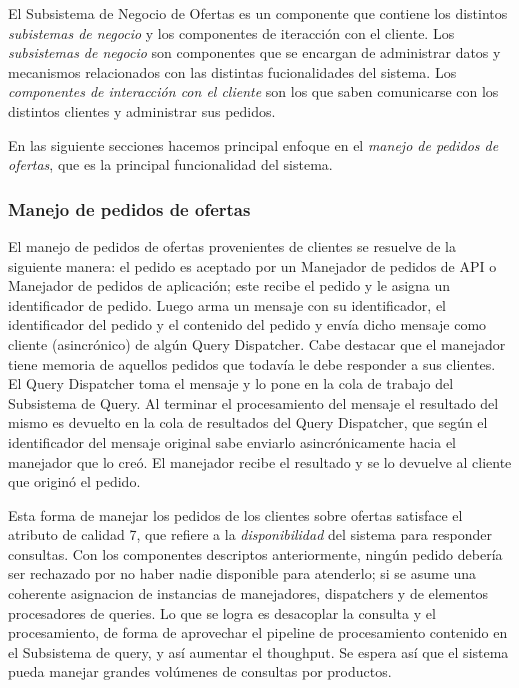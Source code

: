 El \textsf{Subsistema de Negocio de Ofertas} es un componente que contiene los distintos \emph{subistemas de negocio} y los componentes de iteracción con el cliente. Los \emph{subsistemas de negocio} son componentes que se encargan de administrar datos y mecanismos relacionados con las distintas fucionalidades del sistema. Los \emph{componentes de interacción con el cliente} son los que saben comunicarse con los distintos clientes y administrar sus pedidos.

En las siguiente secciones hacemos principal enfoque en el \emph{manejo de pedidos de ofertas}, que es la principal funcionalidad del sistema.

\subsubsection{Manejo de pedidos de ofertas}

El manejo de pedidos de ofertas provenientes de clientes se resuelve de la siguiente manera: el pedido es aceptado por un \textsf{Manejador de pedidos de API} o \textsf{Manejador de pedidos de aplicación}; este recibe el pedido y le asigna un identificador de pedido. Luego arma un mensaje con su identificador, el identificador del pedido y el contenido del pedido y env\'ia dicho mensaje como cliente (asincrónico) de alg\'un \textsf{Query Dispatcher}. Cabe destacar que el manejador tiene memoria de aquellos pedidos que todavía le debe responder a sus clientes. El \textsf{Query Dispatcher} toma el mensaje y lo pone en la cola de trabajo del \textsf{Subsistema de Query}. Al terminar el procesamiento del mensaje el resultado del mismo es devuelto en la cola de resultados del \textsf{Query Dispatcher}, que seg\'un el identificador del mensaje original sabe enviarlo asincrónicamente hacia el manejador que lo creó. El manejador recibe el resultado y se lo devuelve al cliente que originó el pedido.

Esta forma de manejar los pedidos de los clientes sobre ofertas satisface el atributo de calidad 7, que refiere a la \emph{disponibilidad} del sistema para responder consultas. Con los componentes descriptos anteriormente, ning\'un pedido debería ser rechazado por no haber nadie disponible para atenderlo; si se asume una coherente asignacion de instancias de manejadores, dispatchers y de elementos procesadores de queries. Lo que se logra es desacoplar la consulta y el procesamiento, de forma de aprovechar el pipeline de procesamiento contenido en el \textsf{Subsistema de query}, y así aumentar el thoughput. Se espera así que el sistema pueda manejar grandes volúmenes de consultas por productos.

